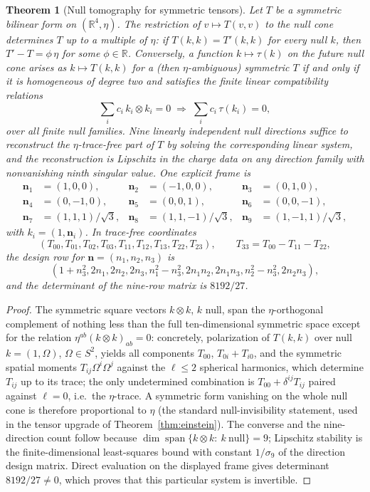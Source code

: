 \documentclass[11pt]{article}
\newtheorem{theorem}{Theorem}[section]
\begin{document}
\begin{theorem}[Null tomography for symmetric tensors]
\label{thm:null-tomography}
Let \(T\) be a symmetric bilinear form on \((\mathbb R^4,\eta)\). The
restriction of \(v\mapsto T(v,v)\) to the null cone determines \(T\) up to a
multiple of \(\eta\): if \(T(k,k)=T'(k,k)\) for every null \(k\), then
\(T'-T=\phi\,\eta\) for some \(\phi\in\mathbb R\). Conversely, a function
\(k\mapsto\tau(k)\) on the future null cone arises as \(k\mapsto T(k,k)\) for
a (then \(\eta\)-ambiguous) symmetric \(T\) if and only if it is homogeneous
of degree two and satisfies the finite linear compatibility relations
\[
\sum_i c_i\,k_i\otimes k_i=0
\;\Longrightarrow\;
\sum_i c_i\,\tau(k_i)=0 ,
\]
over all finite null families. Nine linearly independent null directions
suffice to reconstruct the \(\eta\)-trace-free part of \(T\) by solving the
corresponding linear system, and the reconstruction is Lipschitz in the
charge data on any direction family with nonvanishing ninth singular value.
One explicit frame is
\[
\begin{aligned}
\mathbf n_1&=(1,0,0),&\mathbf n_2&=(-1,0,0),
&\mathbf n_3&=(0,1,0),\\
\mathbf n_4&=(0,-1,0),&\mathbf n_5&=(0,0,1),
&\mathbf n_6&=(0,0,-1),\\
\mathbf n_7&=(1,1,1)/\sqrt3,
&\mathbf n_8&=(1,1,-1)/\sqrt3,
&\mathbf n_9&=(1,-1,1)/\sqrt3,
\end{aligned}
\]
with \(k_i=(1,\mathbf n_i)\). In trace-free coordinates
\[
(T_{00},T_{01},T_{02},T_{03},T_{11},T_{12},T_{13},T_{22},T_{23}),
\qquad T_{33}=T_{00}-T_{11}-T_{22},
\]
the design row for \(\mathbf n=(n_1,n_2,n_3)\) is
\[
(1+n_3^2,2n_1,2n_2,2n_3,n_1^2-n_3^2,
2n_1n_2,2n_1n_3,n_2^2-n_3^2,2n_2n_3),
\]
and the determinant of the nine-row matrix is \(8192/27\).
\end{theorem}

\begin{proof}
The symmetric square vectors \(k\otimes k\), \(k\) null, span the
\(\eta\)-orthogonal complement of nothing less than the full ten-dimensional
symmetric space except for the relation \(\eta^{ab}(k\otimes k)_{ab}=0\):
concretely, polarization of \(T(k,k)\) over null \(k=(1,\Omega)\),
\(\Omega\in S^2\), yields all components \(T_{00}\),
\(T_{0i}+T_{i0}\), and the symmetric spatial moments \(T_{ij}\Omega^i\Omega^j\)
against the \(\ell\leq2\) spherical harmonics, which determine \(T_{ij}\) up
to its trace; the only undetermined combination is
\(T_{00}+\delta^{ij}T_{ij}\) paired against \(\ell=0\), i.e.\ the
\(\eta\)-trace. A symmetric form vanishing on the whole null cone is
therefore proportional to \(\eta\) (the standard null-invisibility statement,
used in the tensor upgrade of Theorem~\ref{thm:einstein}). The
converse and the nine-direction count follow because
\(\dim\operatorname{span}\{k\otimes k:\ k\ \text{null}\}=9\); Lipschitz
stability is the finite-dimensional least-squares bound with constant
\(1/\sigma_9\) of the direction design matrix. Direct evaluation on the
displayed frame gives determinant \(8192/27\ne0\), which proves that this
particular system is invertible.
\end{proof}
\end{document}
